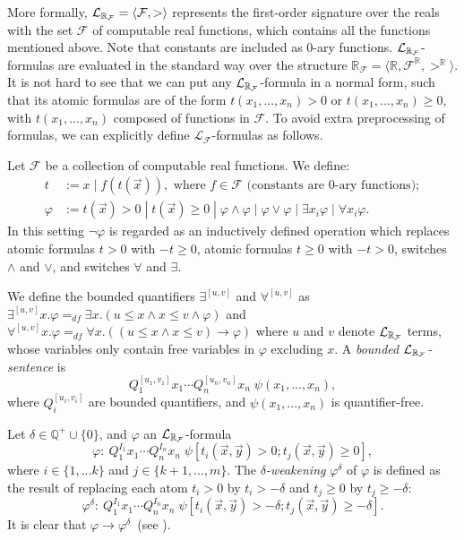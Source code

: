 \documentclass[12pt]{llncs}
\begin{document}
More formally, $\mathcal{L}_{\mathbb{R}_{\mathcal{F}}} = \langle \mathcal{F}, > \rangle$ represents the first-order signature over the reals with the set $\mathcal{F}$ of computable real functions, which contains all the functions mentioned above. Note that constants are included as 0-ary functions. $\mathcal{L}_{\mathbb{R}_{\mathcal{F}}}$-formulas are evaluated in the standard way over the structure $\mathbb{R}_{\mathcal{F}}= \langle \mathbb{R}, \mathcal{F}^{\mathbb{R}}, >^{\mathbb{R}}\rangle$. It is not hard to see that  we can put any $\mathcal{L}_{\mathbb{R}_{\mathcal{F}}}$-formula in a normal form, such that its atomic formulas are of the form $t(x_1,...,x_n)>0$ or $t(x_1,...,x_n)\geq 0$, with $t(x_1,...,x_n)$ composed of functions in $\mathcal{F}$. To avoid extra preprocessing of formulas, we can explicitly define $\mathcal{L}_{\mathcal{F}}$-formulas as follows.
\begin{definition}
Let $\mathcal{F}$ be a collection of computable real functions. We define:
\begin{align*}
t& := x \; | \; f(t(\vec x)), \mbox{ where }f\in \mathcal{F} \mbox{ (constants are 0-ary functions)};\\
\varphi& := t(\vec x)> 0 \; | \; t(\vec x)\geq 0 \; | \; \varphi\wedge\varphi
\; | \; \varphi\vee\varphi \; | \; \exists x_i\varphi \; |\; \forall x_i\varphi.
\end{align*}
In this setting $\neg\varphi$ is regarded as an inductively defined operation
which replaces atomic formulas $t>0$ with $-t\geq 0$, atomic formulas $t\geq 0$
with $-t>0$, switches $\wedge$ and $\vee$, and switches $\forall$ and $\exists$.
\end{definition}
\begin{definition}
We define the bounded quantifiers $\exists^{[u,v]}$ and $\forall^{[u,v]}$ as
$\exists^{[u,v]}x.\varphi =_{df}\exists x. ( u \leq x \land x \leq v \wedge
\varphi)$ and $
\forall^{[u,v]}x.\varphi =_{df} \forall x. ( (u \leq x \land x \leq v)
\rightarrow \varphi)$
where $u$ and $v$ denote $\mathcal{L}_{\mathbb{R}_{\mathcal{F}}}$ terms, whose variables only
contain free variables in $\varphi$ excluding $x$. A {\em bounded $\mathcal{L}_{\mathbb{R}_{\mathcal{F}}}$-sentence} is
$$Q_1^{[u_1,v_1]}x_1\cdots Q_n^{[u_n,v_n]}x_n\;\psi(x_1,...,x_n),$$
where $Q_i^{[u_i,v_i]}$ are bounded quantifiers, and $\psi(x_1,...,x_n)$ is
quantifier-free.
\end{definition}
\begin{definition}\label{variants}
Let $\delta\in \mathbb{Q}^+\cup\{0\}$, and $\varphi$ an
$\mathcal{L}_{\mathbb{R}_{\mathcal{F}}}$-formula
$$\varphi: \ Q_1^{I_1}x_1\cdots Q_n^{I_n}x_n\;\psi[t_i(\vec x, \vec y)>0;
t_j(\vec x, \vec
y)\geq 0],$$ where $i\in\{1,...k\}$ and $j\in\{k+1,...,m\}$. The {\em
$\delta$-weakening} $\varphi^{\delta}$ of $\varphi$ is
defined as the result of replacing each atom $t_i > 0$ by $t_i >
-\delta$ and $t_j \geq 0$ by $t_j \geq -\delta$:
$$\varphi^{\delta}:\ Q_1^{I_1}x_1\cdots Q_n^{I_n}x_n\;\psi[t_i(\vec x, \vec
y)>-\delta; t_j(\vec x,
\vec y)\geq -\delta].$$
It is clear that $\varphi\rightarrow\varphi^{\delta}$~(see \cite{DBLP:conf/lics/GaoAC12}).
\end{definition}
\end{document}
